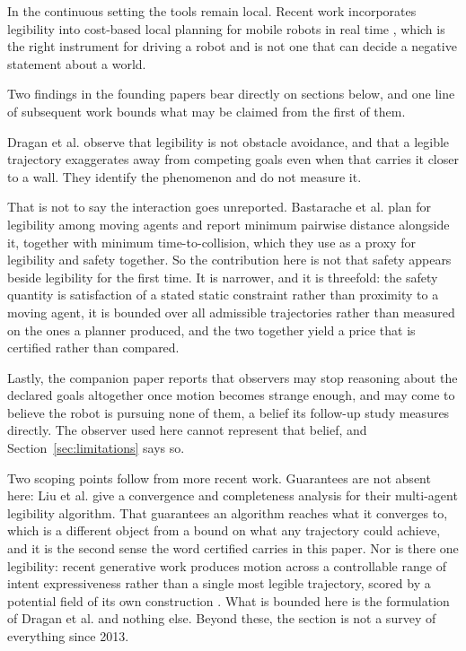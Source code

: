 \documentclass[journal]{IEEEtran}
\begin{document}
In the continuous setting the tools remain local. Recent work incorporates
legibility into cost-based local planning for mobile robots in real time
\cite{amirian2024legibot}, which is the right instrument for driving a robot
and is not one that can decide a negative statement about a world.

Two findings in the founding papers bear directly on sections below, and one
line of subsequent work bounds what may be claimed from the first of them.

Dragan et al. \cite{dragan2013legibility} observe that legibility is not
obstacle avoidance, and that a legible trajectory exaggerates away from
competing goals even when that carries it closer to a wall. They identify the
phenomenon and do not measure it.

That is not to say the interaction goes unreported. Bastarache et al.
\cite{bastarache2023legible} plan for legibility among moving agents and
report minimum pairwise distance alongside it, together with minimum
time-to-collision, which they use as a proxy for legibility and safety
together. So the contribution here is not that safety appears beside
legibility for the first time. It is narrower, and it is threefold: the safety
quantity is satisfaction of a stated static constraint rather than proximity
to a moving agent, it is bounded over all admissible trajectories rather than
measured on the ones a planner produced, and the two together yield a price
that is certified rather than compared.

Lastly, the companion paper \cite{dragan2013generating} reports that observers
may stop reasoning about the declared goals altogether once motion becomes
strange enough, and may come to believe the robot is pursuing none of them, a
belief its follow-up study measures directly. The observer used here cannot
represent that belief, and Section~\ref{sec:limitations} says so.

Two scoping points follow from more recent work. Guarantees are not absent
here: Liu et al. \cite{liu2024active} give a convergence and completeness
analysis for their multi-agent legibility algorithm. That guarantees an
algorithm reaches what it converges to, which is a different object from a
bound on what any trajectory could achieve, and it is the second sense the word
certified carries in this paper. Nor is there one legibility: recent generative
work produces motion across a controllable range of intent expressiveness
rather than a single most legible trajectory, scored by a potential field of
its own construction \cite{shi2025controlling}. What is bounded here is the
formulation of Dragan et al. and nothing else. Beyond these, the section is not
a survey of everything since 2013.
\end{document}
